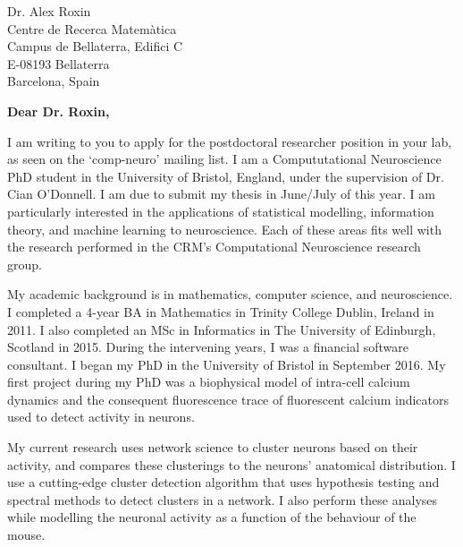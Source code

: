 \documentclass[11pt]{letter} %
\begin{document}

\begin{letter}{Dr. Alex Roxin \\
  Centre de Recerca Matem\`{a}tica \\
  Campus de Bellaterra, Edifici C \\
  E-08193 Bellaterra \\
  Barcelona, Spain} %


  \opening{\textbf{Dear Dr. Roxin,}}

  I am writing to you to apply for the postdoctoral researcher position in your lab, as seen on the `comp-neuro' mailing list. I am a Compututational Neuroscience PhD student in the University of Bristol, England, under the supervision of Dr. Cian O'Donnell. I am due to submit my thesis in June/July of this year. I am particularly interested in the applications of statistical modelling, information theory, and machine learning to neuroscience. Each of these areas fits well with the research performed in the CRM's Computational Neuroscience research group.

  My academic background is in mathematics, computer science, and neuroscience. I completed a 4-year BA in Mathematics in Trinity College Dublin, Ireland in 2011. I also completed an MSc in Informatics in The University of Edinburgh, Scotland in 2015. During the intervening years, I was a financial software consultant. I began my PhD in the University of Bristol in September 2016. My first project during my PhD was a biophysical model of intra-cell calcium dynamics and the consequent fluorescence trace of fluorescent calcium indicators used to detect activity in neurons.

  My current research uses network science to cluster neurons based on their activity, and compares these clusterings to the neurons' anatomical distribution. I use a cutting-edge cluster detection algorithm that uses hypothesis testing and spectral methods to detect clusters in a network. I also perform these analyses while modelling the neuronal activity as a function of the behaviour of the mouse.


\end{letter}
\end{document}
